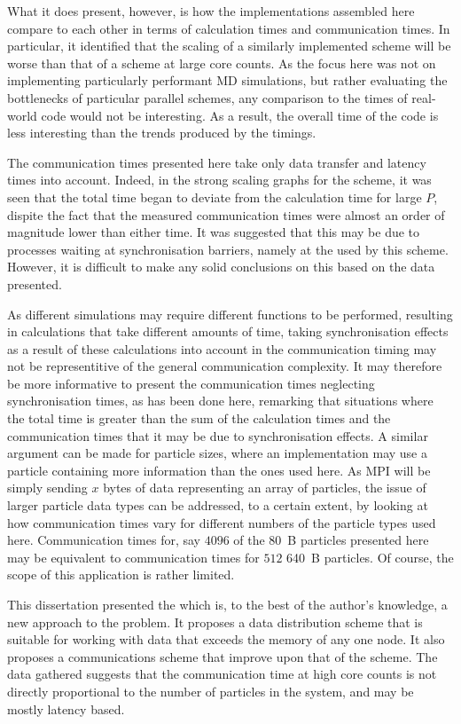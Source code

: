 What it does present, however, is how the implementations assembled here
compare to each other in terms of calculation times and communication times.
%
In particular, it identified that the scaling of a similarly implemented
\systolicloop{} scheme will be worse than that of a \replicateddata{}
scheme at large core counts.
%
As the focus here was not on implementing particularly performant
MD simulations, but rather evaluating the bottlenecks of particular
parallel schemes, any comparison to the times of real-world code
would not be interesting.
%
As a result, the overall time of the code is less interesting than
the trends produced by the timings.

The communication times presented here take only data transfer and
latency times into account.
%
Indeed, in the strong scaling graphs for the \replicatedsystolicloop{}
scheme, it was seen that the total time began to deviate from the
calculation time for large $P$, dispite the fact that the measured
communication times were almost an order of magnitude lower than
either time.
%
It was suggested that this may be due to processes waiting at
synchronisation barriers, namely at the \mpiallreduce{} used
by this scheme.
%
However, it is difficult to make any solid conclusions on this based
on the data presented.

As different simulations may require different functions to be
performed, resulting in calculations that take different amounts
of time, taking synchronisation effects as a result of these calculations
into account in the communication timing may not be
representitive of the general communication complexity.
%
It may therefore be more informative to present the communication
times neglecting synchronisation times, as has been done here,
remarking that situations where the total time is greater than
the sum of the calculation times and the communication times
that it may be due to synchronisation effects.
%
A similar argument can be made for particle sizes, where an implementation
may use a particle containing more information than the ones used here.
%
As MPI will be simply sending $x$ bytes of data representing an
array of particles, the issue of larger particle data types can be addressed,
to a certain extent, by looking at how
communication times vary for different numbers of the particle types used here.
%
Communication times for, say $4096$ of the 80~B particles presented here
may be equivalent to communication times for $512$ 640~B particles.
%
Of course, the scope of this application is rather limited.

This dissertation presented the \replicatedsystolicloop{} which is,
to the best of the author's knowledge, a new approach to the problem.
%
It proposes a data distribution scheme that is suitable for working
with data that exceeds the memory of any one node.
%
It also proposes a communications scheme that improve upon that
of the \replicateddata{} scheme.
%
The data gathered suggests that the communication time at high core
counts is not directly proportional to the number of particles in
the system, and may be mostly latency based.
